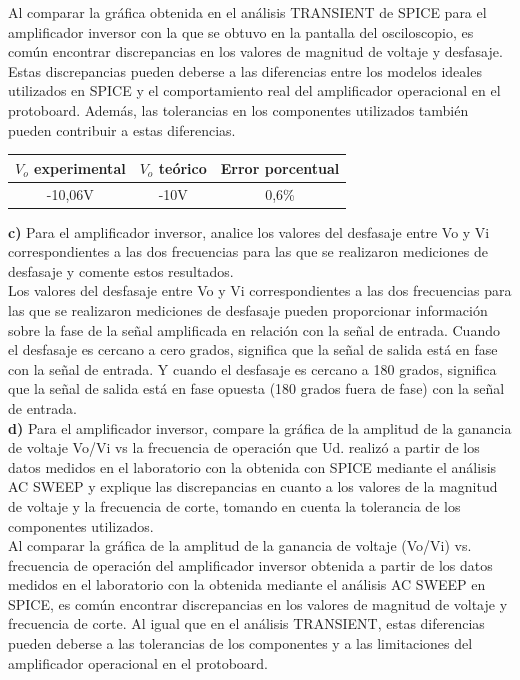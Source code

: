 \documentclass[12pt]{article}
\begin{document}
	Al comparar la gráfica obtenida en el análisis TRANSIENT de SPICE para el amplificador inversor con la que se obtuvo en la pantalla del osciloscopio, es común encontrar discrepancias en los valores de magnitud de voltaje y desfasaje. Estas discrepancias pueden deberse a las diferencias entre los modelos ideales utilizados en SPICE y el comportamiento real del amplificador operacional en el protoboard. Además, las tolerancias en los componentes utilizados también pueden contribuir a estas diferencias.\\
	
	\begin{center}
		\begin{tabular}{|c|c|c|}
			\hline
			$V_{o}$ experimental & $V_{o}$ teórico & Error porcentual \\
			\hline
			-10,06V & -10V & 0,6\% \\
			\hline
		\end{tabular}
	\end{center}
	
	\noindent \textbf{c)} Para el amplificador inversor, analice los valores del desfasaje entre Vo y Vi correspondientes a las dos frecuencias para las que se realizaron mediciones de desfasaje y comente estos resultados.\\
	
	Los valores del desfasaje entre Vo y Vi correspondientes a las dos frecuencias para las que se realizaron mediciones de desfasaje pueden proporcionar información sobre la fase de la señal amplificada en relación con la señal de entrada. Cuando el desfasaje es cercano a cero grados, significa que la señal de salida está en fase con la señal de entrada. Y cuando el desfasaje es cercano a 180 grados, significa que la señal de salida está en fase opuesta (180 grados fuera de fase) con la señal de entrada.\\
	
	\noindent \textbf{d)} Para el amplificador inversor, compare la gráfica de la amplitud de la ganancia de voltaje Vo/Vi vs la frecuencia de operación que Ud. realizó a partir de los datos medidos en el laboratorio con la obtenida con SPICE mediante el análisis AC SWEEP y explique las discrepancias en cuanto a los valores de la magnitud de voltaje y la frecuencia de corte, tomando en cuenta la tolerancia de los componentes utilizados.\\
	
	Al comparar la gráfica de la amplitud de la ganancia de voltaje (Vo/Vi) vs. frecuencia de operación del amplificador inversor obtenida a partir de los datos medidos en el laboratorio con la obtenida mediante el análisis AC SWEEP en SPICE, es común encontrar discrepancias en los valores de magnitud de voltaje y frecuencia de corte. Al igual que en el análisis TRANSIENT, estas diferencias pueden deberse a las tolerancias de los componentes y a las limitaciones del amplificador operacional en el protoboard.\\
	
\end{document}
